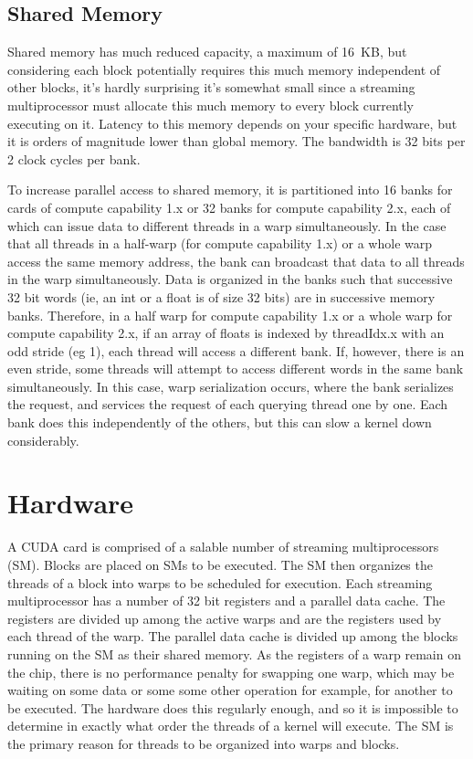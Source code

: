 \documentclass[a4paper,12pt]{report}
\begin{document}
\subsection{Shared Memory}
Shared memory has much reduced capacity, a maximum of 16~KB\cite[p~148]{ CUDA_C_Programming_Guide}, but considering each block potentially requires this much memory independent of other blocks, it's hardly surprising it's somewhat small since a streaming multiprocessor must allocate this much memory to every block currently executing on it.
Latency to this memory depends on your specific hardware, but it is orders of magnitude lower than global memory.
The bandwidth is 32 bits per 2 clock cycles per bank\cite[p~152]{ CUDA_C_Programming_Guide}.

To increase parallel access to shared memory, it is partitioned into 16 banks for cards of compute capability 1.x or 32 banks for compute capability 2.x, each of which can issue data to different threads in a warp simultaneously.
In the case that all threads in a half-warp (for compute capability 1.x) or a whole warp access the same memory address, the bank can broadcast that data to all threads in the warp simultaneously.
Data is organized in the banks such that successive 32 bit words (ie, an int or a float is of size 32 bits) are in successive memory banks.
Therefore, in a half warp for compute capability 1.x or a whole warp for compute capability 2.x, if an array of floats is indexed by threadIdx.x with an odd stride (eg 1), each thread will access a different bank\cite[p~31]{ CUDA_C_Best_Practices_Guide}.
If, however, there is an even stride, some threads will attempt to access different words in the same bank simultaneously.
In this case, warp serialization occurs, where the bank serializes the request, and services the request of each querying thread one by one.
Each bank does this independently of the others, but this can slow a kernel down considerably.


\section{Hardware}
A CUDA card is comprised of a salable number of streaming multiprocessors (SM)\cite[p~79]{ CUDA_C_Programming_Guide}.
Blocks are placed on SMs to be executed.
The SM then organizes the threads of a block into warps to be scheduled for execution.
Each streaming multiprocessor has a number of 32 bit registers and a parallel data cache.
The registers are divided up among the active warps and are the registers used by each thread of the warp.
The parallel data cache is divided up among the blocks running on the SM as their shared memory.
As the registers of a warp remain on the chip, there is no performance penalty for swapping one warp, which may be waiting on some data or some some other operation for example, for another to be executed.
The hardware does this regularly enough, and so it is impossible to determine in exactly what order the threads of a kernel will execute.
The SM is the primary reason for threads to be organized into warps and blocks.
\end{document}
